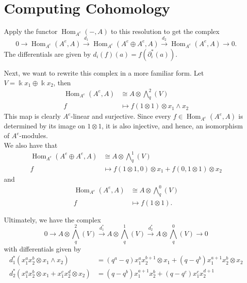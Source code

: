 \documentclass[12pt,a4paper]{article}
\DeclareMathOperator{\Hom}{Hom}
\newcommand{\Wedge}{\textstyle\bigwedge}
\newcommand{\kk}{\Bbbk}
\newcommand\1{_{(1)}}
\newcommand\2{_{(2)}}
\begin{document}
\newpage

\section{Computing Cohomology}
Apply the functor $\Hom_{A^e}(-,A)$ to this resolution to get the complex
\[
0\to \Hom_{A^e}(A^e,A)\xrightarrow{d_1} \Hom_{A^e}(A^e\oplus A^e,A)\xrightarrow{d_2}\Hom_{A^e}(A^e,A)\to 0.  
\]
The differentials are given by $d_i(f)(a)=f(\partial_i^*(a))$.

Next, we want to rewrite this complex in a more familiar form.
Let $V=\kk x_1\oplus \kk x_2$, then
\begin{align*}
\Hom_{A^e}(A^e,A)&\cong A\otimes \Wedge^2_q (V)\\
f&\mapsto f(1\otimes 1)\otimes x_1\wedge x_2
\end{align*}
This map is clearly $A^e$-linear and surjective.
Since every $f\in \Hom_{A^e}(A^e,A)$ is determined by its image on $1\otimes 1$, it is also injective, and hence, an isomorphism of $A^e$-modules.
\\

We also have that
\begin{align*}
\Hom_{A^e}(A^e\oplus A^e,A)&\cong A\otimes \Wedge_q^1(V)\\
f&\mapsto f(1\otimes 1,0)\otimes x_1+f(0,1\otimes 1)\otimes x_2
\end{align*}
and
\begin{align*}
\Hom_{A^e}(A^e,A)&\cong A\otimes \Wedge_q^0 (V)\\
f&\mapsto f(1\otimes 1).
\end{align*}

Ultimately, we have the complex
\[
0 \to A\otimes \Wedge_q^2(V)\xrightarrow{d_1^*}A\otimes \Wedge_q^1(V)\xrightarrow{d_2^*}A\otimes \Wedge_q^0(V)\to 0
\]
with differentials given by
\begin{align*}
d_1^*(x_1^ax_2^b\otimes x_1\wedge x_2)&=(q^{a}-q)x_1^ax_2^{b+1}\otimes x_1+(q-q^{b})x_1^{a+1}x_2^b\otimes x_2\\
d_2^*(x_1^ax_2^b\otimes x_1+x_1^cx_2^d\otimes x_2)&=(q-q^{b})x_1^{a+1}x_2^b+(q-q^{c})x_1^cx_2^{d+1}
\end{align*}
\end{document}
